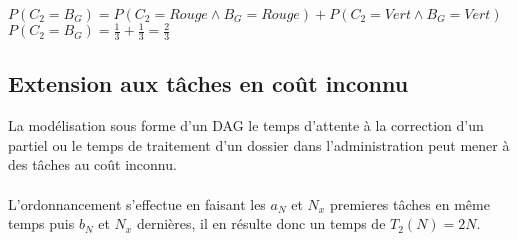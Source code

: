 \documentclass[11pt]{article}
\begin{document}
\paragraph{}
$P(C_2=B_G) = P(C_2=Rouge \wedge B_G=Rouge) + P(C_2=Vert \wedge B_G=Vert)$ \\
$P(C_2=B_G) = \frac{1}{3} + \frac{1}{3} = \frac{2}{3}$

\subsection{Extension aux tâches en coût inconnu}
La modélisation sous forme d'un DAG le temps d'attente à la correction d'un partiel ou le temps de traitement d'un dossier dans l'administration peut mener à des tâches au coût inconnu. 

\paragraph{}
L'ordonnancement s'effectue en faisant les $a_N$ et $N_x$ premieres tâches en même temps puis $b_N$ et $N_x$ dernières, il en résulte donc un temps de $T_2(N) = 2N$.

\paragraph{}
\end{document}
